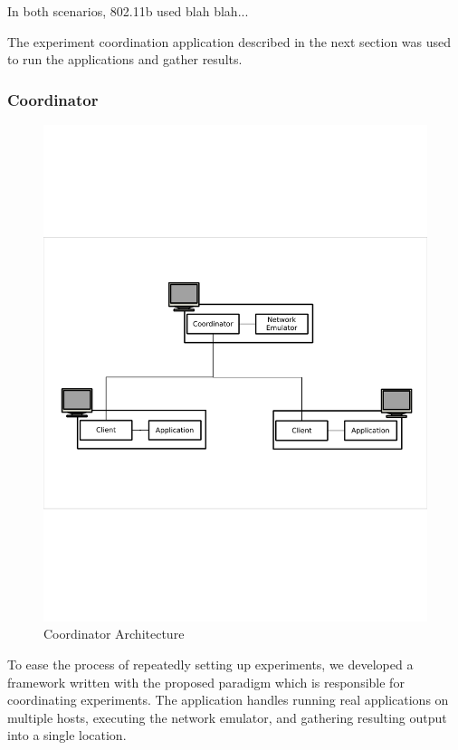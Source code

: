\documentclass[lnicst]{svmultln}
\begin{document}
In both scenarios, 802.11b used blah blah...

The experiment coordination application described in the next section was used to run the applications and gather results.

\subsubsection{Coordinator}

\begin{figure}
\centering
\includegraphics[scale = .50, clip, trim = 10px 240px 10px 250px]{figures/experiment_arch.pdf}
\caption{Coordinator Architecture}
\label{fig:architecture}
\end{figure}

To ease the process of repeatedly setting up experiments, we developed a framework written with the proposed paradigm which is responsible for coordinating experiments. The application handles running real applications on multiple hosts, executing the network emulator, and gathering resulting output into a single location.
\end{document}
